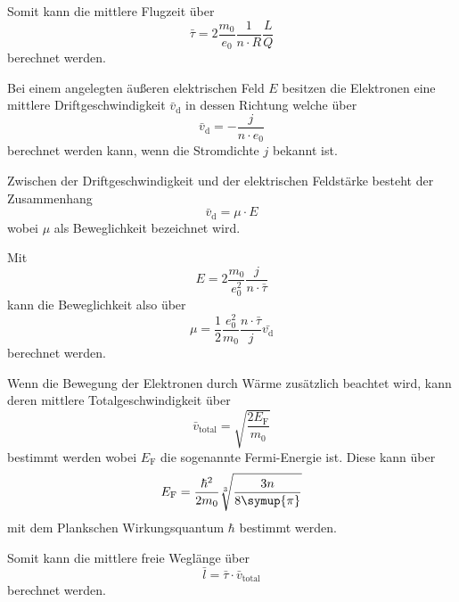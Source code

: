 Somit kann die mittlere Flugzeit über 
\begin{equation}
    \bar{\tau} = 2\frac{m_0}{e_0}\frac{1}{n \cdot R}\frac{L}{Q}
\end{equation}
berechnet werden. \cite{V311}

Bei einem angelegten äußeren elektrischen Feld $E$ besitzen die Elektronen eine mittlere Driftgeschwindigkeit $\bar{v}_\text{d}$ in dessen Richtung welche über 
\begin{equation}
    \bar{v}_\text{d} = -\frac{j}{n \cdot e_0}
    \label{eq:driftgeschwindigkeit}
\end{equation}
berechnet werden kann, wenn die Stromdichte $j$ bekannt ist. \cite{V311}

Zwischen der Driftgeschwindigkeit und der elektrischen Feldstärke besteht der Zusammenhang
\begin{equation}
    \bar{v}_\text{d} = \mu \cdot E
\end{equation}
wobei $\mu$ als Beweglichkeit bezeichnet wird. \cite{V311}

Mit 
\begin{equation}
    E = 2 \frac{m_0}{e_0^2}\frac{j}{n\cdot\bar{\tau}}
\end{equation}
kann die Beweglichkeit also über
\begin{equation}
    \mu = \frac{1}{2}\frac{e_0^2}{m_0}\frac{n\cdot\bar{\tau}}{j} \bar{v_\text{d}}
    \label{eq:beweglichkeit}
\end{equation}
berechnet werden. \cite{V311}

Wenn die Bewegung der Elektronen durch Wärme zusätzlich beachtet wird, kann deren mittlere Totalgeschwindigkeit über
\begin{equation}
    \bar{v}_\text{total} = \sqrt{\frac{2 E_\text{F}}{m_0}}
    \label{eq:totalgeschwindigkeit}
\end{equation}
bestimmt werden wobei $E_\text{F}$ die sogenannte Fermi-Energie ist.
Diese kann über 
\begin{equation}
    E_\text{F} = \frac{\hbar^2}{2 m_0}\sqrt[3]{\frac{3n}{8\symup{\pi}}}
    \label{eq:fermienergie}
\end{equation}
mit dem Plankschen Wirkungsquantum $\hbar$ bestimmt werden. \cite{V311}

Somit kann die mittlere freie Weglänge über
\begin{equation}
    \bar{l} = \bar{\tau} \cdot \bar{v}_\text{total}
\end{equation}
berechnet werden.

